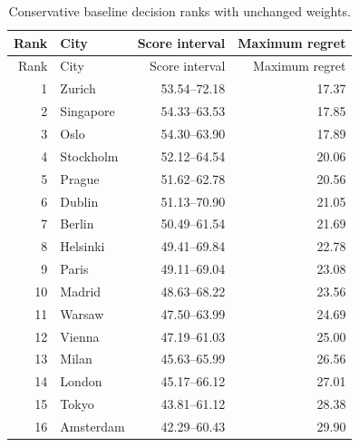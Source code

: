 \begin{longtable}{rlrr}
\caption{Conservative baseline decision ranks with unchanged weights.}\label{tab:baseline}\\
\toprule Rank & City & Score interval & Maximum regret\\\midrule
\endfirsthead
\toprule Rank & City & Score interval & Maximum regret\\\midrule\endhead
1 & Zurich & 53.54--72.18 & 17.37 \\
2 & Singapore & 54.33--63.53 & 17.85 \\
3 & Oslo & 54.30--63.90 & 17.89 \\
4 & Stockholm & 52.12--64.54 & 20.06 \\
5 & Prague & 51.62--62.78 & 20.56 \\
6 & Dublin & 51.13--70.90 & 21.05 \\
7 & Berlin & 50.49--61.54 & 21.69 \\
8 & Helsinki & 49.41--69.84 & 22.78 \\
9 & Paris & 49.11--69.04 & 23.08 \\
10 & Madrid & 48.63--68.22 & 23.56 \\
11 & Warsaw & 47.50--63.99 & 24.69 \\
12 & Vienna & 47.19--61.03 & 25.00 \\
13 & Milan & 45.63--65.99 & 26.56 \\
14 & London & 45.17--66.12 & 27.01 \\
15 & Tokyo & 43.81--61.12 & 28.38 \\
16 & Amsterdam & 42.29--60.43 & 29.90 \\
\bottomrule
\end{longtable}
